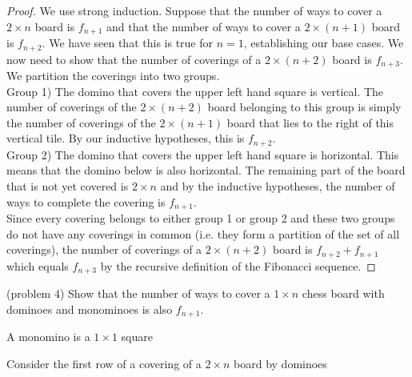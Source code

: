 \documentclass[handout]{ximera}
\begin{document}
\begin{proof}
We use strong induction. Suppose that the number of ways to cover a $2 \times n$ board is $f_{n+1}$ and that the number of ways to cover a 
$2 \times (n+1)$ board is $f_{n+2}$. We have seen that this is true for $n = 1$, establishing our base cases.
We now need to show that the number of coverings of a $2 \times (n+2)$ board is $f_{n+3}$. We partition the coverings into two groups.\\
Group 1) The domino that covers the upper left hand square is vertical.  The number of coverings of 
the $2 \times (n+2)$ board belonging to this group is simply the number of coverings of the $2 \times (n+1)$ board that 
lies to the right of this vertical tile.  By our inductive hypotheses, this is $f_{n+2}$.\\
Group 2) The domino that covers the upper left hand square is horizontal. This means that the domino below is also horizontal. 
The remaining part of the board that is not yet covered is $2 \times n$ and by the inductive hypotheses, 
the number of ways to complete the covering is $f_{n+1}$.\\
Since every covering belongs to either group 1 or group 2 and these two groups do not have any coverings in 
common (i.e. they form a partition of the set of all coverings), the number of coverings of a $2 \times (n+2)$ board 
is $f_{n+2} + f_{n+1}$ which equals $f_{n+3}$ by the recursive definition of the Fibonacci sequence.

\end{proof}

\begin{problem}(problem 4) Show that the number of ways to cover a $1 \times n$ chess board with dominoes and monominoes is also $f_{n+1}$.
\begin{hint}
A monomino is a $1 \times 1$ square
\end{hint}
\begin{hint}
Consider the first row of a covering of a $2 \times n$ board by dominoes
\end{hint}
\end{problem}
\end{document}
